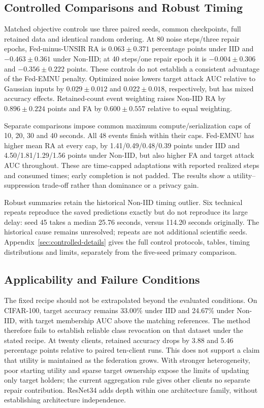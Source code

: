 \documentclass[software,article,submit,moreauthors]{Definitions/mdpi}
\begin{document}
\subsection{Controlled Comparisons and Robust Timing}
\label{sec:controlled-summary}
Matched objective controls use three paired seeds, common checkpoints, full
retained data and identical random ordering. At 80 noise steps/three repair
epochs, Fed-minus-UNSIR RA is $0.063\pm0.371$ percentage points under IID
and $-0.463\pm0.361$ under Non-IID; at 40 steps/one repair epoch it is
$-0.004\pm0.306$ and $-0.356\pm0.222$ points. These controls do not establish
a consistent advantage of the Fed-EMNU penalty. Optimized noise lowers target
attack AUC relative to Gaussian inputs by $0.029\pm0.012$ and
$0.022\pm0.018$, respectively, but has mixed accuracy effects.
Retained-count event weighting raises Non-IID RA by $0.896\pm0.224$ points
and FA by $0.600\pm0.557$ relative to equal weighting.

Separate comparisons impose common maximum compute/serialization caps of
10, 20, 30 and 40 seconds. All 48 events finish within their caps. Fed-EMNU
has higher mean RA at every cap, by 1.41/0.49/0.48/0.39 points under IID
and 4.50/1.81/1.29/1.56 points under Non-IID, but also higher FA and target
attack AUC throughout. These are time-capped adaptations with reported
realized steps and consumed times; early completion is not padded. The results
show a utility--suppression trade-off rather than dominance or a privacy gain.

Robust summaries retain the historical Non-IID timing outlier. Six technical
repeats reproduce the saved predictions exactly but do not reproduce its large
delay: seed 45 takes a median 25.76 seconds, versus 114.20 seconds originally.
The historical cause remains unresolved; repeats are not additional scientific
seeds. Appendix~\ref{sec:controlled-details} gives the full control protocols,
tables, timing distributions and limits, separately from the five-seed primary
comparison.

\subsection{Applicability and Failure Conditions}
\label{sec:applicability}
The fixed recipe should not be extrapolated beyond the evaluated conditions.
On CIFAR-100, target accuracy remains 33.00\% under IID and 24.67\% under
Non-IID, with target membership AUC above the matching references. The method
therefore fails to establish reliable class revocation on that dataset under
the stated recipe. At twenty clients, retained accuracy drops by 3.88 and 5.46
percentage points relative to paired ten-client runs. This does not support
a claim that utility is maintained as the federation grows. With stronger
heterogeneity, poor starting utility and sparse target ownership expose the
limits of updating only target holders; the current aggregation rule gives
other clients no separate repair contribution. ResNet34 adds depth within one
architecture family, without establishing architecture independence.
\end{document}

